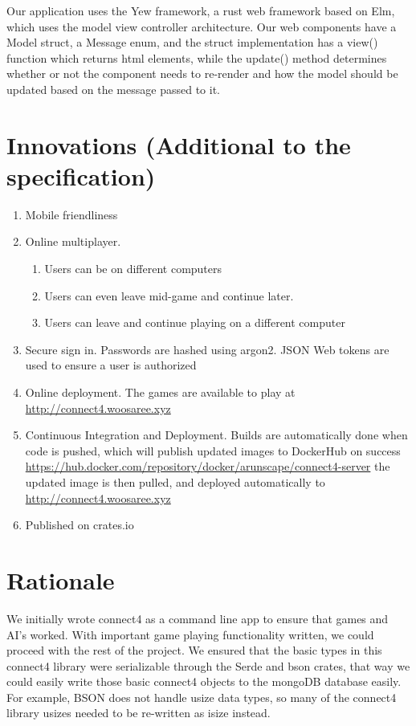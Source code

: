 \documentclass[letterpaper]{article}
\begin{document}
Our application uses the Yew framework, a rust web framework based on Elm, which uses the model
view controller architecture. Our web components have a Model struct, a Message enum, and the
struct implementation has a view() function which returns html elements, while the update()
method determines whether or not the component needs to re-render and how the model should be updated
based on the message passed to it.



\section{Innovations (Additional to the specification)}
\begin{enumerate}
    \item Mobile friendliness
    \item Online multiplayer.
        \begin{enumerate}
            \item Users can be on different computers
            \item Users can even leave mid-game and continue later.
            \item Users can leave and continue playing on a different computer
        \end{enumerate}
    \item Secure sign in. Passwords are hashed using argon2. JSON Web tokens are used to ensure a user
        is authorized
    \item Online deployment. The games are available to play at \url{http://connect4.woosaree.xyz}
    \item Continuous Integration and Deployment. Builds are automatically done when code is pushed,
        which will publish updated images to DockerHub on success \url{https://hub.docker.com/repository/docker/arunscape/connect4-server}
        the updated image is then pulled, and deployed automatically to \url{http://connect4.woosaree.xyz}
    \item Published on crates.io

\end{enumerate}

\section{Rationale}

We initially wrote connect4 as a command line app to ensure that games and AI's worked. With important game playing functionality written, we could proceed with the rest of the project. We ensured that the basic types in this connect4 library were serializable through the Serde and bson crates, that way we could easily write those basic connect4 objects to the mongoDB database easily. For example, BSON does not handle usize data types, so many of the connect4 library usizes needed to be re-written as isize instead.
\end{document}
